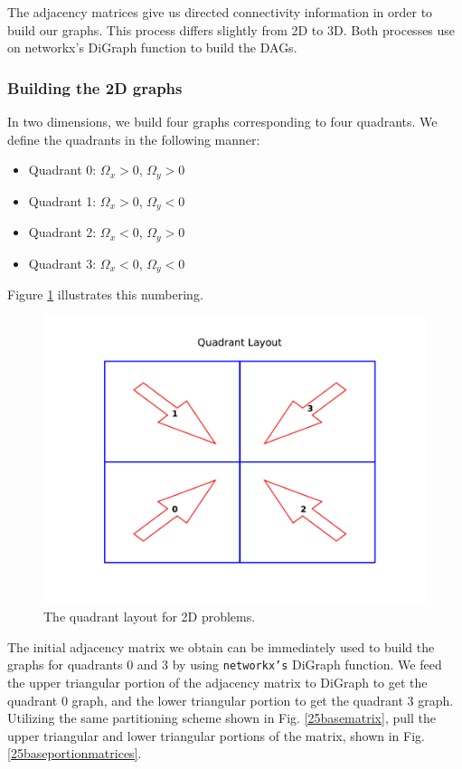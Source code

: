 The adjacency matrices give us directed connectivity information in order to build our graphs. This process differs slightly from 2D to 3D. Both processes use on networkx's DiGraph function to build the DAGs.

\subsubsection{Building the 2D graphs}
In two dimensions, we build four graphs corresponding to four quadrants.
We define the quadrants in the following manner:
\begin{itemize}
  \item Quadrant 0: $\Omega_x > 0$, $\Omega_y > 0$
  \item Quadrant 1: $\Omega_x > 0$, $\Omega_y < 0$
  \item Quadrant 2: $\Omega_x < 0$, $\Omega_y > 0$
  \item Quadrant 3: $\Omega_x < 0$, $\Omega_y < 0$
\end{itemize}
Figure \ref{quadrant_layout} illustrates this numbering.
\begin{figure}[H]
\centering
\includegraphics{figures/quadrant_layout.pdf}
\caption{The quadrant layout for 2D problems.}
\label{quadrant_layout}
\end{figure}
The initial adjacency matrix we obtain can be immediately used to build the graphs for quadrants 0 and 3 by using {\tt networkx's} DiGraph function.
We feed the upper triangular portion of the adjacency matrix to DiGraph to get the quadrant 0 graph, and the lower triangular portion to get the quadrant 3 graph.
Utilizing the same partitioning scheme shown in Fig. \ref{25basematrix}, pull the upper triangular and lower triangular portions of the matrix, shown in Fig. \ref{25baseportionmatrices}.
